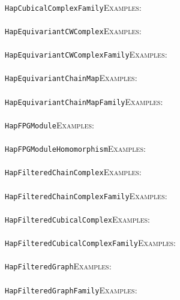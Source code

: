 \documentclass[a4paper,11pt]{report}
\begin{document}
{{ \\
 \texttt{HapCubicalComplexFamily}{\nobreakspace}{\nobreakspace}{\nobreakspace}{\nobreakspace}\textsc{Examples:} \\
 \\
 \texttt{HapEquivariantCWComplex}{\nobreakspace}{\nobreakspace}{\nobreakspace}{\nobreakspace}\textsc{Examples:} \\
 \\
 \texttt{HapEquivariantCWComplexFamily}{\nobreakspace}{\nobreakspace}{\nobreakspace}{\nobreakspace}\textsc{Examples:} \\
 \\
 \texttt{HapEquivariantChainMap}{\nobreakspace}{\nobreakspace}{\nobreakspace}{\nobreakspace}\textsc{Examples:} \\
 \\
 \texttt{HapEquivariantChainMapFamily}{\nobreakspace}{\nobreakspace}{\nobreakspace}{\nobreakspace}\textsc{Examples:} \\
 \\
 \texttt{HapFPGModule}{\nobreakspace}{\nobreakspace}{\nobreakspace}{\nobreakspace}\textsc{Examples:} \\
 \\
 \texttt{HapFPGModuleHomomorphism}{\nobreakspace}{\nobreakspace}{\nobreakspace}{\nobreakspace}\textsc{Examples:} \\
 \\
 \texttt{HapFilteredChainComplex}{\nobreakspace}{\nobreakspace}{\nobreakspace}{\nobreakspace}\textsc{Examples:} \\
 \\
 \texttt{HapFilteredChainComplexFamily}{\nobreakspace}{\nobreakspace}{\nobreakspace}{\nobreakspace}\textsc{Examples:} \\
 \\
 \texttt{HapFilteredCubicalComplex}{\nobreakspace}{\nobreakspace}{\nobreakspace}{\nobreakspace}\textsc{Examples:} \\
 \\
 \texttt{HapFilteredCubicalComplexFamily}{\nobreakspace}{\nobreakspace}{\nobreakspace}{\nobreakspace}\textsc{Examples:} \\
 \\
 \texttt{HapFilteredGraph}{\nobreakspace}{\nobreakspace}{\nobreakspace}{\nobreakspace}\textsc{Examples:} \\
 \\
 \texttt{HapFilteredGraphFamily}{\nobreakspace}{\nobreakspace}{\nobreakspace}{\nobreakspace}\textsc{Examples:} \\
 \\
}}
\end{document}
